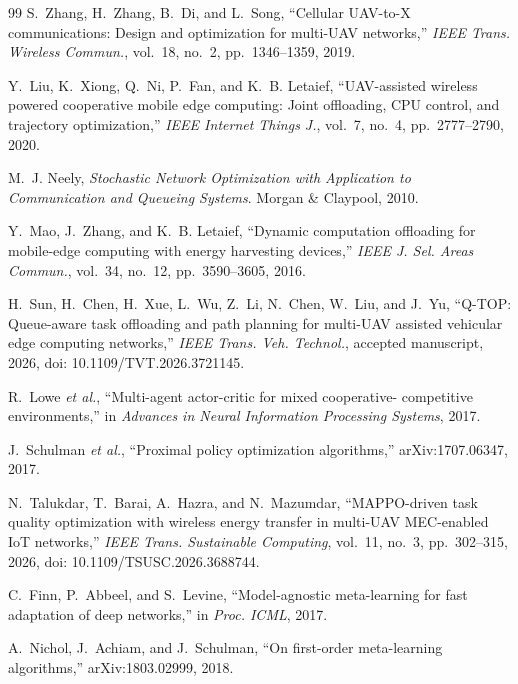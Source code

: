 \documentclass[journal]{IEEEtran}
\begin{document}
\begin{thebibliography}{99}
S.~Zhang, H.~Zhang, B.~Di, and L.~Song, ``Cellular UAV-to-X communications:
Design and optimization for multi-UAV networks,'' \emph{IEEE Trans. Wireless
Commun.}, vol.~18, no.~2, pp.~1346--1359, 2019.

Y.~Liu, K.~Xiong, Q.~Ni, P.~Fan, and K.~B. Letaief, ``UAV-assisted wireless
powered cooperative mobile edge computing: Joint offloading, CPU control, and
trajectory optimization,'' \emph{IEEE Internet Things J.}, vol.~7, no.~4,
pp.~2777--2790, 2020.

M.~J. Neely, \emph{Stochastic Network Optimization with Application to
Communication and Queueing Systems}. Morgan \& Claypool, 2010.

Y.~Mao, J.~Zhang, and K.~B. Letaief, ``Dynamic computation offloading for
mobile-edge computing with energy harvesting devices,'' \emph{IEEE J. Sel.
Areas Commun.}, vol.~34, no.~12, pp.~3590--3605, 2016.

H.~Sun, H.~Chen, H.~Xue, L.~Wu, Z.~Li, N.~Chen, W.~Liu, and J.~Yu,
``Q-TOP: Queue-aware task offloading and path planning for multi-UAV assisted
vehicular edge computing networks,'' \emph{IEEE Trans. Veh. Technol.},
accepted manuscript, 2026, doi: 10.1109/TVT.2026.3721145.

R.~Lowe \emph{et al.}, ``Multi-agent actor-critic for mixed cooperative-
competitive environments,'' in \emph{Advances in Neural Information
Processing Systems}, 2017.

J.~Schulman \emph{et al.}, ``Proximal policy optimization algorithms,''
arXiv:1707.06347, 2017.

N.~Talukdar, T.~Barai, A.~Hazra, and N.~Mazumdar, ``MAPPO-driven task quality optimization with
wireless energy transfer in multi-UAV MEC-enabled IoT networks,'' \emph{IEEE
Trans. Sustainable Computing}, vol.~11, no.~3, pp.~302--315, 2026,
doi: 10.1109/TSUSC.2026.3688744.

C.~Finn, P.~Abbeel, and S.~Levine, ``Model-agnostic meta-learning for fast
adaptation of deep networks,'' in \emph{Proc. ICML}, 2017.

A.~Nichol, J.~Achiam, and J.~Schulman, ``On first-order meta-learning
algorithms,'' arXiv:1803.02999, 2018.


\end{thebibliography}
\end{document}
